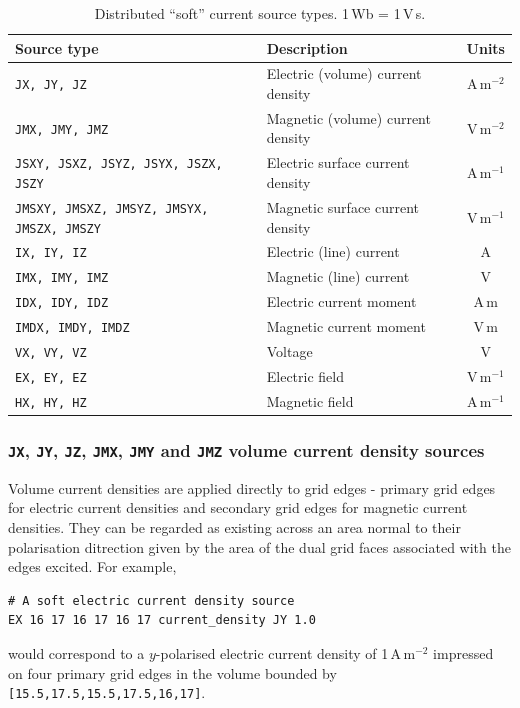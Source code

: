 \documentclass[onecolumn,a4paper]{article}
\numberwithin{equation}{section}
\begin{document}
\begin{table}[ht]
\begin{center}
\begin{tabular}{|l|l|c|}\hline
Source type                                       &Description                        &Units       \\
\hline
\texttt{JX, JY, JZ}                               &Electric (volume) current density  &A\,m$^{-2}$ \\
\texttt{JMX, JMY, JMZ}                            &Magnetic (volume) current density  &V\,m$^{-2}$ \\
\texttt{JSXY, JSXZ, JSYZ, JSYX, JSZX, JSZY}       &Electric surface current density   &A\,m$^{-1}$ \\
\texttt{JMSXY, JMSXZ, JMSYZ, JMSYX, JMSZX, JMSZY} &Magnetic surface current density   &V\,m$^{-1}$ \\
\texttt{IX, IY, IZ}                               &Electric (line) current            &A           \\
\texttt{IMX, IMY, IMZ}                            &Magnetic (line) current            &V           \\
\texttt{IDX, IDY, IDZ}                            &Electric current moment            &A\,m        \\
\texttt{IMDX, IMDY, IMDZ}                         &Magnetic current moment            &V\,m        \\
\texttt{VX, VY, VZ}                               &Voltage                            &V           \\
\texttt{EX, EY, EZ}                               &Electric field                     &V\,m$^{-1}$ \\
\texttt{HX, HY, HZ}                               &Magnetic field                     &A\,m$^{-1}$ \\
\hline
\end{tabular}
\caption{\label{tb:exsoft}Distributed ``soft'' current source types. 1\,Wb = 1\,V\,s.}
\end{center}
\end{table}

\subsubsection{\texttt{JX}, \texttt{JY}, \texttt{JZ}, \texttt{JMX}, \texttt{JMY} and \texttt{JMZ} volume current density sources}

Volume current densities are applied directly to grid edges - primary grid edges for electric current densities and secondary grid 
edges for magnetic current densities. They can be regarded as existing across an area normal to their polarisation ditrection
given by the area of the dual grid faces associated with the edges excited.
For example,
\begin{verbatim}
# A soft electric current density source
EX 16 17 16 17 16 17 current_density JY 1.0
\end{verbatim}
would correspond to a $y$-polarised electric current density of 1\,A\,m$^{-2}$ impressed on four primary
grid edges in the volume bounded by \texttt{[15.5,17.5,15.5,17.5,16,17]}.
\end{document}

